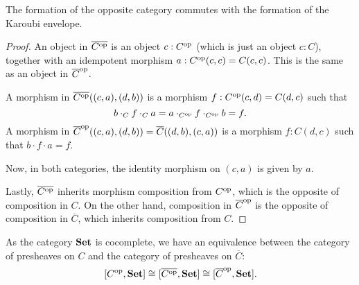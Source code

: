 \begin{lemma}
  The formation of the opposite category commutes with the formation of the Karoubi envelope.
\end{lemma}
\begin{proof}
  An object in $ \overline{C^{\text{op}}} $ is an object $ c: C^{\text{op}} $ (which is just an object $ c: C $), together with an idempotent morphism $ a: C^{\text{op}}(c, c) = C(c, c) $. This is the same as an object in $ \overline C^{\text{op}} $.

  A morphism in $ \overline{C^{\text{op}}}((c, a), (d, b)) $ is a morphism $ f: C^{\text{op}}(c, d) = C(d, c) $ such that
  \[ b \cdot_C f \cdot_C a = a \cdot_{C^{\text{op}}} f \cdot_{C^{\text{op}}} b = f. \]
  A morphism in $ \overline C^{\text{op}}((c, a), (d, b)) = \overline C((d, b), (c, a)) $ is a morphism $ f: C(d, c) $ such that $ b \cdot f \cdot a = f $.

  Now, in both categories, the identity morphism on $ (c, a) $ is given by $ a $.

  Lastly, $ \overline {C^{\text{op}}} $ inherits morphism composition from $ C^{\text{op}} $, which is the opposite of composition in $ C $. On the other hand, composition in $ \overline C^{\text{op}} $ is the opposite of composition in $ \overline C $, which inherits composition from $ C $.
\end{proof}

\begin{corollary}\label{cor:karoubi-presheaf}
  As the category $ \mathbf{Set} $ is cocomplete, we have an equivalence between the category of presheaves on $ C $ and the category of presheaves on $ \overline C $:
  \[ [C^{\text{op}}, \mathbf{Set}] \cong [\overline{C^{\text{op}}}, \mathbf{Set}] \cong [\overline C^{\text{op}}, \mathbf{Set}]. \]
\end{corollary}
